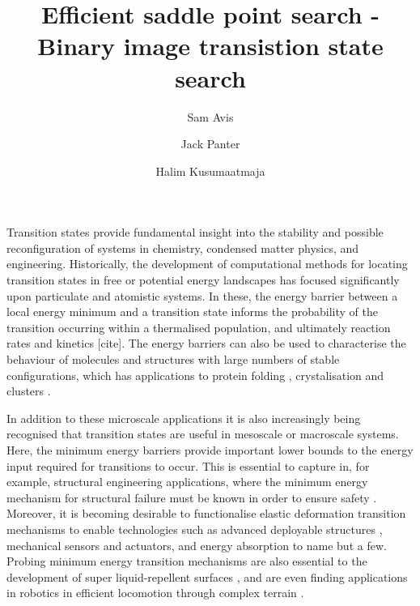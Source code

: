 \documentclass[aps,twocolumn]{revtex4-1}
\newcommand{\temp}[1]{{\leavevmode\color{red}#1}}
\begin{document}
\title{Efficient saddle point search - Binary image transistion state search}
\author{Sam Avis}
\author{Jack Panter}
\author{Halim Kusumaatmaja}

\begin{abstract}
\lipsum[1]
\end{abstract}

\maketitle


\topic Transition states provide fundamental insight into the stability and possible reconfiguration of systems in chemistry, condensed matter physics, and engineering.
Historically, the development of computational methods for locating transition states in free or potential energy landscapes has focused significantly upon particulate and atomistic systems.
In these, the energy barrier between a local energy minimum and a transition state informs the probability of the transition occurring within a thermalised population, and ultimately reaction rates and kinetics \temp{[cite]}.
The energy barriers can also be used to characterise the behaviour of molecules and structures with large numbers of stable configurations, which has applications to protein folding \cite{Bryngelson1995,Onuchic1997}, crystalisation and clusters \cite{Wales1998,Wales2012}.

In addition to these microscale applications it is also increasingly being recognised that transition states are useful in mesoscale or macroscale systems.
Here, the minimum energy barriers provide important lower bounds to the energy input required for transitions to occur.
This is essential to capture in, for example, structural engineering applications, where the minimum energy mechanism for structural failure must be known in order to ensure safety \cite{Panter2019,Hutchinson2018}.
Moreover, it is becoming desirable to functionalise elastic deformation transition mechanisms to enable technologies such as advanced deployable structures \cite{Filipov2015,Zhai2018}, mechanical sensors and actuators, and energy absorption \cite{Shan2015} to name but a few.
Probing minimum energy transition mechanisms are also essential to the development of super liquid-repellent surfaces \cite{Zhang2014,Panter2019b}, and are even finding applications in robotics in efficient locomotion through complex terrain \cite{Othayoth2020}.
\end{document}
